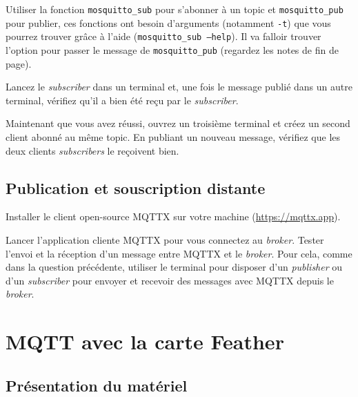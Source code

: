 \documentclass[11pt]{paper}
\newcommand\sub{{\it subscriber}\xspace}
\newcommand\subs{{\it subscribers}\xspace}
\newcommand\pub{{\it publisher}\xspace}
\newcommand\broker{{\it broker}\xspace}
\begin{document}
Utiliser la fonction {\tt mosquitto\_sub} pour s’abonner à un topic et {\tt mosquitto\_pub} pour publier, ces fonctions ont besoin d’arguments (notamment {\tt -t}) que vous pourrez trouver grâce à l'aide ({\tt mosquitto\_sub --help}). Il va falloir trouver l'option pour passer le message de {\tt mosquitto\_pub} (regardez les notes de fin de page).

Lancez le \sub dans un terminal et, une fois le message publié dans un autre terminal, vérifiez qu’il a bien été reçu par le \sub. 

Maintenant que vous avez réussi, ouvrez un troisième terminal et créez un second client abonné au même topic. En publiant un nouveau message, vérifiez que les deux clients \subs le reçoivent bien.\\




\subsection{Publication et souscription distante}

Installer le client open-source MQTTX sur votre machine (\url{https://mqttx.app}).

Lancer l'application cliente MQTTX pour vous connectez au \broker. Tester l'envoi et la réception d'un message entre MQTTX et le \broker. Pour cela, comme dans la question précédente, utiliser le terminal pour disposer d'un \pub ou d'un \sub pour envoyer et recevoir des messages avec MQTTX depuis le \broker.\\


  \section{MQTT avec la carte Feather}

\subsection{Présentation du matériel}
\end{document}
